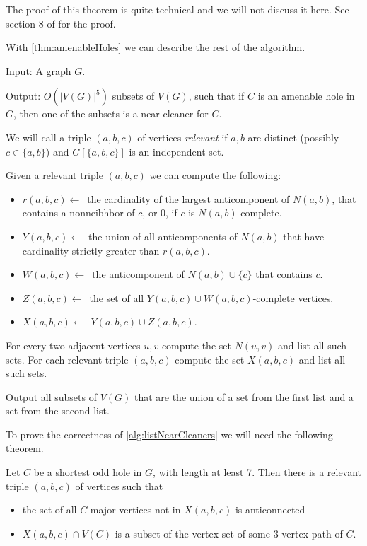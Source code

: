 The proof of this theorem is quite technical and we will not discuss it here. See section 8 of \cite{MC05} for the proof.

With \cref{thm:amenableHoles} we can describe the rest of the algorithm.

\begin{alg}
	\label{alg:listNearCleaners}
	Input: A graph $G$.

	\noindent Output: $O(|V(G)|^5)$ subsets of $V(G)$, such that if $C$ is an amenable hole in $G$, then one of the subsets is a near-cleaner for $C$.
\end{alg}
\begin{algtext2}
	We will call a triple $(a, b, c)$ of vertices \emph{relevant} if $a, b$ are distinct (possibly $c \in \{a, b\}$) and $G[\{a,b,c\}]$ is an independent set.

	Given a relevant triple $(a, b, c)$ we can compute the following:
	\begin{itemize}
		\item $r(a,b,c) \leftarrow$~the cardinality of the largest anticomponent of $N(a, b)$, that contains a nonneibhbor of $c$, or 0, if $c$ is $N(a, b)$-complete.
		\item $Y(a,b,c) \leftarrow$~the union of all anticomponents of $N(a, b)$ that have cardinality strictly greater than $r(a, b, c)$.
		\item $W(a, b, c) \leftarrow$~the anticomponent of $N(a,b) \cup \{c\}$ that contains $c$.
		\item $Z(a, b, c) \leftarrow$~the set of all $Y(a, b, c) \cup W(a,b,c)$-complete vertices.
		\item $X(a, b, c) \leftarrow$~$Y(a,b,c) \cup Z(a,b,c)$.
	\end{itemize}

	For every two adjacent vertices $u, v$ compute the set $N(u, v)$ and list all such sets.
	For each relevant triple $(a,b,c)$ compute the set $X(a,b,c)$ and list all such sets.

	Output all subsets of $V(G)$ that are the union of a set from the first list and a set from the second list.
\end{algtext2}

To prove the correctness of \cref{alg:listNearCleaners} we will need the following theorem.

\begin{theorem}[9.1 of \cite{MC05}]
	\label{thm:91}
	Let $C$ be a shortest odd hole in $G$, with length at least 7. Then there is a relevant triple $(a, b, c)$ of vertices such that
	\begin{itemize}
		\item the set of all $C$-major vertices not in $X(a, b, c)$ is anticonnected
		\item $X(a, b, c) \cap V(C)$ is a subset of the vertex set of some 3-vertex path of $C$.
	\end{itemize}
\end{theorem}

